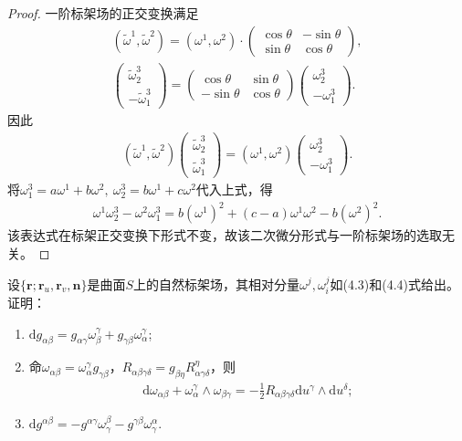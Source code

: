 \documentclass[../../main.tex]{subfiles}%
\begin{document}
\begin{proof}
一阶标架场的正交变换满足
\begin{align*}
(\widetilde{\omega}^1,\widetilde{\omega}^2)=(\omega^1,\omega^2)\cdot\begin{pmatrix}\cos\theta&-\sin\theta\\\sin\theta&\cos\theta\end{pmatrix},\\
\begin{pmatrix}\widetilde{\omega}_2^3\\-\widetilde{\omega}_1^3\end{pmatrix}=\begin{pmatrix}\cos\theta&\sin\theta\\-\sin\theta&\cos\theta\end{pmatrix}\begin{pmatrix}\omega_2^3\\-\omega_1^3\end{pmatrix}.
\end{align*}
因此
\begin{align*}
(\widetilde{\omega}^1,\widetilde{\omega}^2)\begin{pmatrix}\widetilde{\omega}_2^3\\\widetilde{\omega}_1^3\end{pmatrix}=(\omega^1,\omega^2)\begin{pmatrix}\omega_2^3\\-\omega_1^3\end{pmatrix}.
\end{align*}
将$\omega_1^3=a\omega^1+b\omega^2,\ \omega_2^3=b\omega^1+c\omega^2$代入上式，得
\begin{align}
\omega^1\omega_2^3-\omega^2\omega_1^3=b(\omega^1)^2+(c-a)\omega^1\omega^2-b(\omega^2)^2.
\label{eq:invariant-2form}
\end{align}
该表达式在标架正交变换下形式不变，故该二次微分形式与一阶标架场的选取无关。
\end{proof}

\begin{example}
设$\{\bm{r};\bm{r}_u,\bm{r}_v,\bm{n}\}$是曲面$S$上的自然标架场，其相对分量$\omega^j,\omega_i^j$如(4.3)和(4.4)式给出。证明：
\begin{enumerate}[(1)]
\item $\mathrm{d}g_{\alpha\beta}=g_{\alpha\gamma}\omega_\beta^\gamma+g_{\gamma\beta}\omega_\alpha^\gamma$;
\item 命$\omega_{\alpha\beta}=\omega_\alpha^\gamma g_{\gamma\beta}$，$R_{\alpha\beta\gamma\delta}=g_{\beta\eta}R_{\alpha\gamma\delta}^\eta$，则
\begin{align*}
\mathrm{d}\omega_{\alpha\beta}+\omega_\alpha^\gamma\land\omega_{\beta\gamma}=-\frac{1}{2}R_{\alpha\beta\gamma\delta}\mathrm{d}u^\gamma\land\mathrm{d}u^\delta;
\end{align*}
\item $\mathrm{d}g^{\alpha\beta}=-g^{\alpha\gamma}\omega_\gamma^\beta-g^{\gamma\beta}\omega_\gamma^\alpha$.
\end{enumerate}
\end{example}
\end{document}
